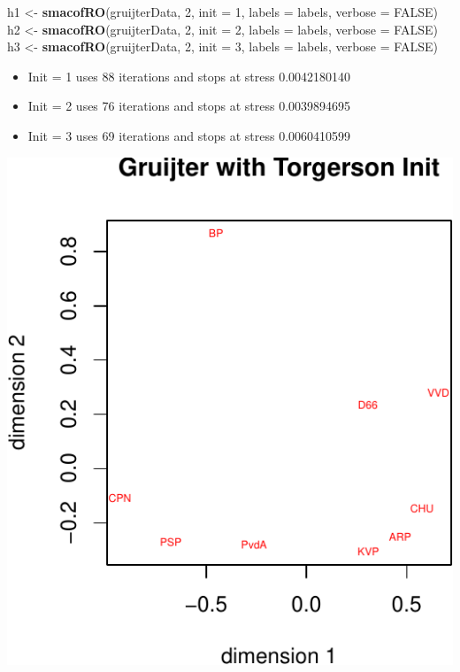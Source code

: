 \documentclass[
  12pt,
]{article}
\newenvironment{Shaded}{\begin{snugshade}}{\end{snugshade}}
\newcommand{\AttributeTok}[1]{\textcolor[rgb]{0.13,0.29,0.53}{#1}}
\newcommand{\ConstantTok}[1]{\textcolor[rgb]{0.56,0.35,0.01}{#1}}
\newcommand{\DecValTok}[1]{\textcolor[rgb]{0.00,0.00,0.81}{#1}}
\newcommand{\FunctionTok}[1]{\textcolor[rgb]{0.13,0.29,0.53}{\textbf{#1}}}
\newcommand{\NormalTok}[1]{#1}
\newcommand{\OtherTok}[1]{\textcolor[rgb]{0.56,0.35,0.01}{#1}}
\providecommand{\tightlist}{%
  \setlength{\itemsep}{0pt}\setlength{\parskip}{0pt}}
\begin{document}
\begin{Shaded}
\begin{Highlighting}[]
\NormalTok{h1 }\OtherTok{\textless{}{-}} \FunctionTok{smacofRO}\NormalTok{(gruijterData, }\DecValTok{2}\NormalTok{, }\AttributeTok{init =} \DecValTok{1}\NormalTok{, }\AttributeTok{labels =}\NormalTok{ labels, }\AttributeTok{verbose =} \ConstantTok{FALSE}\NormalTok{)}
\NormalTok{h2 }\OtherTok{\textless{}{-}} \FunctionTok{smacofRO}\NormalTok{(gruijterData, }\DecValTok{2}\NormalTok{, }\AttributeTok{init =} \DecValTok{2}\NormalTok{, }\AttributeTok{labels =}\NormalTok{ labels, }\AttributeTok{verbose =} \ConstantTok{FALSE}\NormalTok{)}
\NormalTok{h3 }\OtherTok{\textless{}{-}} \FunctionTok{smacofRO}\NormalTok{(gruijterData, }\DecValTok{2}\NormalTok{, }\AttributeTok{init =} \DecValTok{3}\NormalTok{, }\AttributeTok{labels =}\NormalTok{ labels, }\AttributeTok{verbose =} \ConstantTok{FALSE}\NormalTok{)}
\end{Highlighting}
\end{Shaded}

\begin{itemize}
\tightlist
\item
  Init = 1 uses 88 iterations and stops at stress 0.0042180140
\item
  Init = 2 uses 76 iterations and stops at stress 0.0039894695
\item
  Init = 3 uses 69 iterations and stops at stress 0.0060410599
\end{itemize}

\begin{center}\includegraphics{smacofRO_files/figure-latex/gruiterconfs-1} \end{center}
\end{document}
